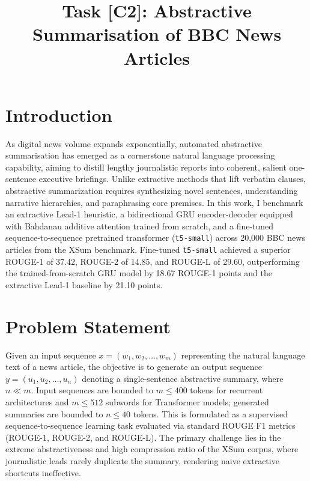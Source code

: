 \documentclass[conference,10pt,a4paper]{IEEEtran}
\begin{document}
\title{Task [C2]: Abstractive Summarisation of BBC News Articles}
\author{
}
\maketitle

\section{Introduction}
As digital news volume expands exponentially, automated abstractive summarisation has emerged as a cornerstone natural language processing capability, aiming to distill lengthy journalistic reports into coherent, salient one-sentence executive briefings. Unlike extractive methods that lift verbatim clauses, abstractive summarization requires synthesizing novel sentences, understanding narrative hierarchies, and paraphrasing core premises. In this work, I benchmark an extractive Lead-1 heuristic, a bidirectional GRU encoder-decoder equipped with Bahdanau additive attention trained from scratch, and a fine-tuned sequence-to-sequence pretrained transformer (\texttt{t5-small}) across 20,000 BBC news articles from the XSum benchmark. Fine-tuned \texttt{t5-small} achieved a superior ROUGE-1 of 37.42, ROUGE-2 of 14.85, and ROUGE-L of 29.60, outperforming the trained-from-scratch GRU model by 18.67 ROUGE-1 points and the extractive Lead-1 baseline by 21.10 points.

\section{Problem Statement}
Given an input sequence $x = (w_1, w_2, \dots, w_m)$ representing the natural language text of a news article, the objective is to generate an output sequence $y = (u_1, u_2, \dots, u_n)$ denoting a single-sentence abstractive summary, where $n \ll m$. Input sequences are bounded to $m \le 400$ tokens for recurrent architectures and $m \le 512$ subwords for Transformer models; generated summaries are bounded to $n \le 40$ tokens. This is formulated as a supervised sequence-to-sequence learning task evaluated via standard ROUGE F1 metrics (ROUGE-1, ROUGE-2, and ROUGE-L). The primary challenge lies in the extreme abstractiveness and high compression ratio of the XSum corpus, where journalistic leads rarely duplicate the summary, rendering naive extractive shortcuts ineffective.
\end{document}
